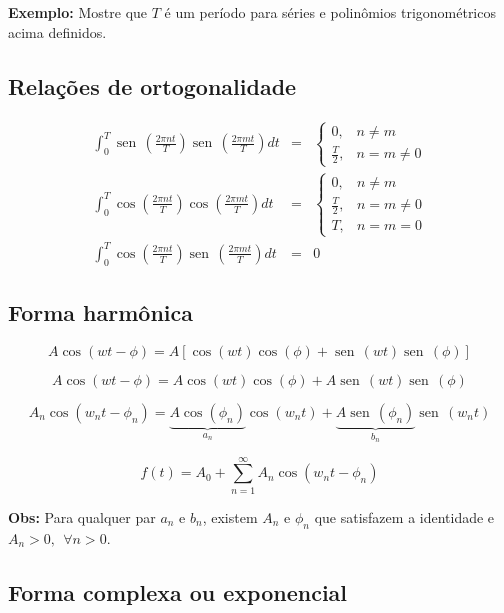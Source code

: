 \documentclass[a4paper,10pt]{book}
\newcommand{\sen}{\operatorname{sen}\,}
\renewcommand{\sin}{\operatorname{sen}\,}
\begin{document}
 {\bf Exemplo:}
  Mostre que $T$ é um período para séries e  polinômios trigonométricos acima definidos.

 \subsection{Relações de ortogonalidade}
 \begin{eqnarray*}
 \int_{0}^T \sen\left(\frac{2\pi nt}{T}\right) \sen\left(\frac{2\pi mt}{T}\right)dt&=&\left\{
 \begin{array}{ll}0, &n\neq m\\ \frac{T}{2}, &n=m\neq 0 \end{array} \right.\label{rel_ort_ss}\\
 \int_{0}^T \cos\left(\frac{2\pi nt}{T}\right) \cos\left(\frac{2\pi mt}{T}\right)dt&=&\left\{
 \begin{array}{ll}0, &n\neq m\\ \frac{T}{2}, &n=m\neq 0\\ T,&n=m=0 \end{array} \right.\label{rel_ort_cc}\\
 \int_{0}^T \cos\left(\frac{2\pi nt}{T}\right) \sen\left(\frac{2\pi mt}{T}\right)dt&=&0\label{rel_ort_sc}\label{rel_ort_cs}
 \end{eqnarray*}

\subsection{Forma harmônica}
$$A\cos(wt-\phi)=A\left[\cos(wt)\cos(\phi)+\sin(wt)\sin(\phi)\right]$$

$$A\cos(wt-\phi)=A\cos(wt)\cos(\phi)+A\sin(wt)\sin(\phi)$$

$$A_n\cos(w_nt-\phi_n)=\underbrace{A\cos(\phi_n)}_{a_n}\cos(w_nt)+\underbrace{A\sin(\phi_n)}_{b_n}\sin(w_nt)$$

$$f(t)=A_0+\sum_{n=1}^\infty A_n\cos(w_nt-\phi_n)$$

{\bf Obs:} Para qualquer par $a_n$ e $b_n$, existem $A_n$ e $\phi_n$ que satisfazem a identidade e $A_n>0,~~\forall n>0$.

\subsection{Forma complexa ou exponencial}
\end{document}

